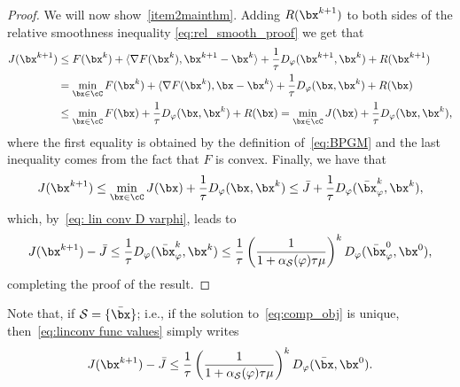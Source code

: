 \documentclass[11pt]{amsart}
\begin{document}
\begin{proof}
We will now show~\cref{item2mainthm}. Adding $R(\bx^{k+1})$ to both sides of the relative smoothness inequality \eqref{eq:rel_smooth_proof} we get that
$$
\begin{aligned}
J(\bx^{k+1})&\leq F(\bx^k)+\langle \nabla F(\bx^k),\bx^{k+1}-\bx^k\rangle+\frac{1}{\tau}D_{\varphi}(\bx^{k+1},\bx^k)+R(\bx^{k+1})\\
&=\min_{\bx\in\cC} F(\bx^k)+\langle \nabla F(\bx^k),\bx-\bx^k\rangle+\frac{1}{\tau}D_{\varphi}(\bx,\bx^k)+R(\bx)\\
&\leq \min_{\bx\in\cC} F(\bx)+\frac{1}{\tau}D_{\varphi}(\bx,\bx^k)+R(\bx)= \min_{\bx\in\cC} J(\bx)+\frac{1}{\tau}D_{\varphi}(\bx,\bx^k),
\end{aligned}
$$
where the first equality is obtained by the definition of~\eqref{eq:BPGM} and  the last inequality comes from the fact that $F$ is convex. Finally, we have that
$$
J(\bx^{k+1})\leq \min_{\bx\in\cC} J(\bx)+\frac{1}{\tau}D_{\varphi}(\bx,\bx^k)\leq \bar J+\frac{1}{\tau}D_{\varphi}(\bar\bx^k_{\varphi},\bx^k),
$$
which, by~\cref{eq: lin conv D varphi}, leads to
\begin{equation}\label{eq:rate_func_val}
    J(\bx^{k+1})-\bar J\leq \frac{1}{\tau}D_{\varphi}(\bar\bx^k_{\varphi},\bx^k)\leq \frac{1}{\tau}\left(\frac{1}{1+\alpha_\mathcal{S}(\varphi)\tau\mu}\right)^kD_{\varphi}(\bar\bx^0_{\varphi},\bx^0),
\end{equation}
completing the proof of the result.
\end{proof}
Note that, if $\mathcal{S}=\{\bar\bx\}$; i.e., if the solution to~\cref{eq:comp_obj} is unique, then~\cref{eq:linconv func values} simply writes
$$
J(\bx^{k+1})-\bar J\leq \frac{1}{\tau}\left(\frac{1}{1+\alpha_\mathcal{S}(\varphi)\tau\mu}\right)^kD_{\varphi}(\bar\bx,\bx^0).
$$
\end{document}
